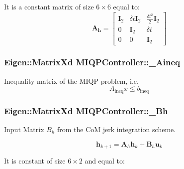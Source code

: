 \-It is a constant matrix of size $6\times6$ equal to\-: \[ \mathbf{A_h} = \left[ \begin{array}{ccc} \mathbf{I}_2 & \delta t \mathbf{I}_2 & \frac{\delta t^2}{2} \mathbf{I}_2 \\ 0 & \mathbf{I}_2 & \delta t \\ 0 & 0 & \mathbf{I}_2 \end{array} \right] \] \hypertarget{classMIQPController_a7678fd8e1c08986d7ae0dc1a884040e1}{
\subsubsection[{\-\_\-\-Aineq}]{\setlength{\rightskip}{0pt plus 5cm}\-Eigen\-::\-Matrix\-Xd {\bf \-M\-I\-Q\-P\-Controller\-::\-\_\-\-Aineq}}}\label{classMIQPController_a7678fd8e1c08986d7ae0dc1a884040e1}
\-Inequality matrix of the \-M\-I\-Q\-P problem, i.\-e. \[ A_{\text{ineq}} x \leq b_{\text{ineq}} \] \hypertarget{classMIQPController_a9a989875871a898f0ad19b441a2c67ba}{
\subsubsection[{\-\_\-\-Bh}]{\setlength{\rightskip}{0pt plus 5cm}\-Eigen\-::\-Matrix\-Xd {\bf \-M\-I\-Q\-P\-Controller\-::\-\_\-\-Bh}}}\label{classMIQPController_a9a989875871a898f0ad19b441a2c67ba}
\-Input \-Matrix $B_h$ from the \-Co\-M jerk integration scheme.

\[ \mathbf{h}_{k+1} = \mathbf{A}_h \mathbf{h}_k + \mathbf{B}_h \mathbf{u}_k \]

\-It is constant of size $6\times2$ and equal to\-:

